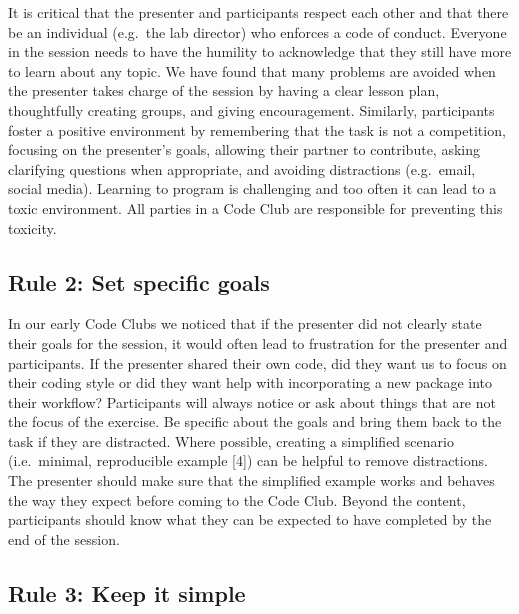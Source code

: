 \documentclass[
  11pt,
]{article}
\begin{document}
It is critical that the presenter and participants respect each other
and that there be an individual (e.g.~the lab director) who enforces a
code of conduct. Everyone in the session needs to have the humility to
acknowledge that they still have more to learn about any topic. We have
found that many problems are avoided when the presenter takes charge of
the session by having a clear lesson plan, thoughtfully creating groups,
and giving encouragement. Similarly, participants foster a positive
environment by remembering that the task is not a competition, focusing
on the presenter's goals, allowing their partner to contribute, asking
clarifying questions when appropriate, and avoiding distractions
(e.g.~email, social media). Learning to program is challenging and too
often it can lead to a toxic environment. All parties in a Code Club are
responsible for preventing this toxicity.

\hypertarget{rule-2-set-specific-goals}{%
\subsection{Rule 2: Set specific
goals}\label{rule-2-set-specific-goals}}

In our early Code Clubs we noticed that if the presenter did not clearly
state their goals for the session, it would often lead to frustration
for the presenter and participants. If the presenter shared their own
code, did they want us to focus on their coding style or did they want
help with incorporating a new package into their workflow? Participants
will always notice or ask about things that are not the focus of the
exercise. Be specific about the goals and bring them back to the task if
they are distracted. Where possible, creating a simplified scenario
(i.e.~minimal, reproducible example {[}4{]}) can be helpful to remove
distractions. The presenter should make sure that the simplified example
works and behaves the way they expect before coming to the Code Club.
Beyond the content, participants should know what they can be expected
to have completed by the end of the session.

\hypertarget{rule-3-keep-it-simple}{%
\subsection{Rule 3: Keep it simple}\label{rule-3-keep-it-simple}}
\end{document}
